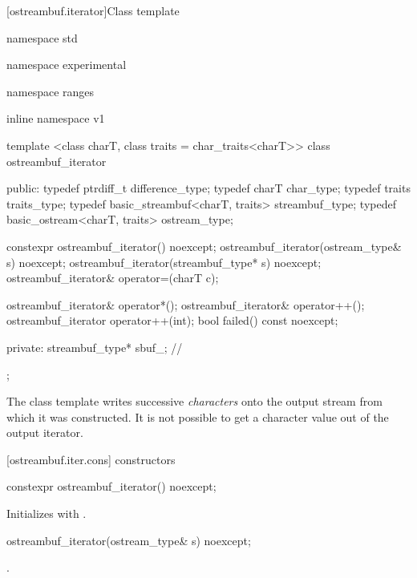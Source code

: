 [ostreambuf.iterator]{Class template }

%
\begin{codeblock}
namespace std { namespace experimental { namespace ranges { inline namespace v1 {
  template <class charT, class traits = char_traits<charT>>
  class ostreambuf_iterator {
  public:
    typedef ptrdiff_t                      difference_type;
    typedef charT                          char_type;
    typedef traits                         traits_type;
    typedef basic_streambuf<charT, traits> streambuf_type;
    typedef basic_ostream<charT, traits>   ostream_type;

    constexpr ostreambuf_iterator() noexcept;
    ostreambuf_iterator(ostream_type& s) noexcept;
    ostreambuf_iterator(streambuf_type* s) noexcept;
    ostreambuf_iterator& operator=(charT c);

    ostreambuf_iterator& operator*();
    ostreambuf_iterator& operator++();
    ostreambuf_iterator operator++(int);
    bool failed() const noexcept;

  private:
    streambuf_type* sbuf_;                // \expos
  };
}}}}
\end{codeblock}

\pnum
The
class template
writes successive
\textit{characters}
onto the output stream from which it was constructed.
It is not possible to get a character value out of the output iterator.

[ostreambuf.iter.cons]{ constructors}

%
\begin{itemdecl}
constexpr ostreambuf_iterator() noexcept;
\end{itemdecl}

\begin{itemdescr}
\pnum
\effects
Initializes  with .
\end{itemdescr}

%
\begin{itemdecl}
ostreambuf_iterator(ostream_type& s) noexcept;
\end{itemdecl}

\begin{itemdescr}
\pnum
\requires
{}.
\end{itemdescr}

